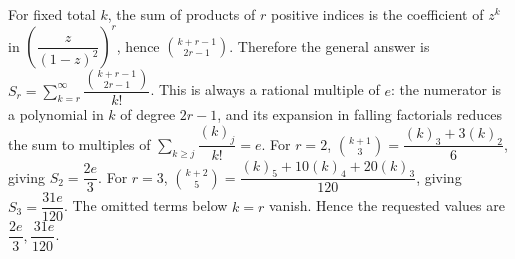 For fixed total $k$, the sum of products of $r$ positive indices is the coefficient of $z^k$ in $(\dfrac{z}{(1-z)^2})^r$, hence $\binom{k+r-1}{2r-1}$. Therefore the general answer is $\boxed{S_r = \sum_{k=r}^{\infty} \dfrac{\binom{k+r-1}{2r-1}}{k !}}$. This is always a rational multiple of $e$: the numerator is a polynomial in $k$ of degree $2r-1$, and its expansion in falling factorials reduces the sum to multiples of $\sum_{k\ge j} \dfrac{(k)_j}{k !} = e$. For $r=2$, $\binom{k+1}{3} = \dfrac{(k)_3+3(k)_2}{6}$, giving $S_2 = \dfrac{2 e}{3}$. For $r=3$, $\binom{k+2}{5} = \dfrac{(k)_5+10(k)_4+20(k)_3}{120}$, giving $S_3 = \dfrac{31 e}{120}$. The omitted terms below $k=r$ vanish. Hence the requested values are $\boxed{\dfrac{2 e}{3} , \dfrac{\  31 e}{120}}$.
